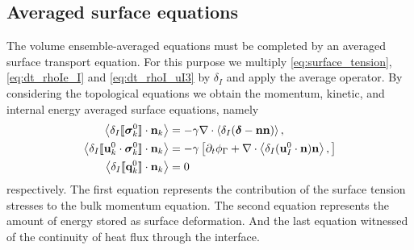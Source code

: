 \subsection{Averaged surface equations}
The volume ensemble-averaged equations must be completed by an averaged surface transport equation.  
For this purpose we multiply \ref{eq:surface_tension}, \ref{eq:dt_rhoIe_I} and \ref{eq:dt_rhoI_uI3} by $\delta_I$ and apply the average operator.
By considering the topological equations we obtain the  momentum, kinetic, and internal energy averaged surface equations, namely
\begin{align}
    \label{eq:dt_avg_uI}
    \avg{\delta_I \Jump{\bm{\sigma}^0_k}}
    &= -\gamma \div \avg{\delta_I (\bm\delta - \textbf{nn})},\\
    \label{eq:dt_avg_gamma}
    \avg{\delta_I \Jump{\textbf{u}_k^0 \cdot \bm{\sigma}^0_k}}
    &= - \gamma \left[
        \pddt \phi_\Gamma
        +  \div \avg{\delta_I (\textbf{u}_{I}^0 \cdot \textbf{n})\textbf{n} },
    \right]\\
    \avg{\delta_I \Jump{\textbf{q}^0_k}}
    &= 0
\end{align}
respectively. 
The first equation represents the contribution of the surface tension stresses to the bulk momentum equation.
The second equation represents the amount of energy stored as surface deformation.
And the last equation witnessed of the continuity of heat flux through the interface. 

